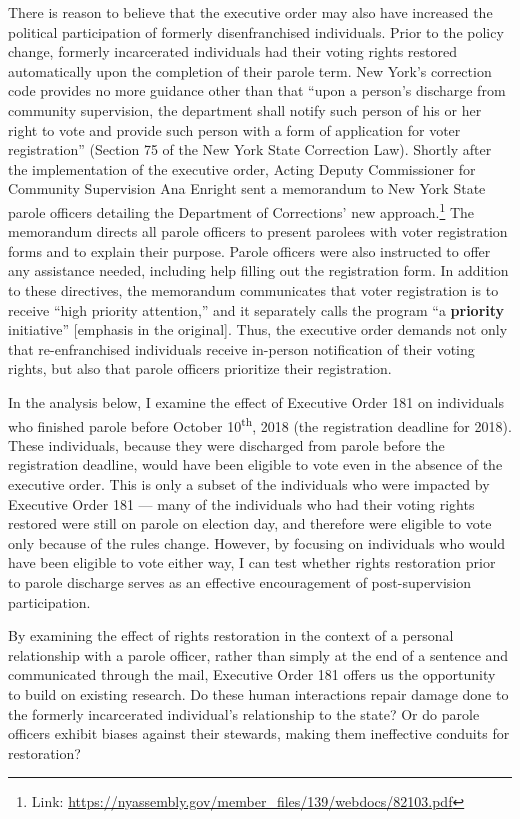 \documentclass[
  12pt,
]{article}
\begin{document}
There is reason to believe that the executive order may also have increased the political participation of formerly disenfranchised individuals. Prior to the policy change, formerly incarcerated individuals had their voting rights restored automatically upon the completion of their parole term. New York's correction code provides no more guidance other than that ``upon a person's discharge from community supervision, the department shall notify such person of his or her right to vote and provide such person with a form of application for voter registration'' (Section 75 of the New York State Correction Law). Shortly after the implementation of the executive order, Acting Deputy Commissioner for Community Supervision Ana Enright sent a memorandum to New York State parole officers detailing the Department of Corrections' new approach.\footnote{Link: \url{https://nyassembly.gov/member_files/139/webdocs/82103.pdf}} The memorandum directs all parole officers to present parolees with voter registration forms and to explain their purpose. Parole officers were also instructed to offer any assistance needed, including help filling out the registration form. In addition to these directives, the memorandum communicates that voter registration is to receive ``high priority attention,'' and it separately calls the program ``a \textbf{priority} initiative'' {[}emphasis in the original{]}. Thus, the executive order demands not only that re-enfranchised individuals receive in-person notification of their voting rights, but also that parole officers prioritize their registration.

In the analysis below, I examine the effect of Executive Order 181 on individuals who finished parole before October 10\textsuperscript{th}, 2018 (the registration deadline for 2018). These individuals, because they were discharged from parole before the registration deadline, would have been eligible to vote even in the absence of the executive order. This is only a subset of the individuals who were impacted by Executive Order 181 --- many of the individuals who had their voting rights restored were still on parole on election day, and therefore were eligible to vote only because of the rules change. However, by focusing on individuals who would have been eligible to vote either way, I can test whether rights restoration prior to parole discharge serves as an effective encouragement of post-supervision participation.

By examining the effect of rights restoration in the context of a personal relationship with a parole officer, rather than simply at the end of a sentence and communicated through the mail, Executive Order 181 offers us the opportunity to build on existing research. Do these human interactions repair damage done to the formerly incarcerated individual's relationship to the state? Or do parole officers exhibit biases against their stewards, making them ineffective conduits for restoration?
\end{document}
